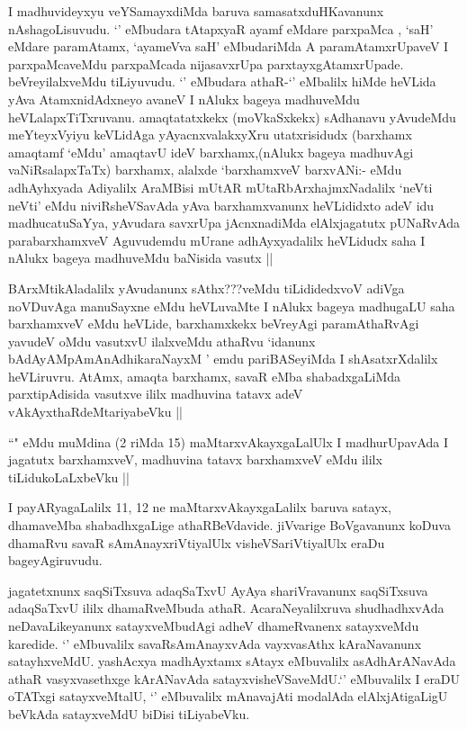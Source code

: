 \begin{artha}
 I madhuvideyxyu veYSamayxdiMda baruva samasatxduHKavanunx nAshagoLisuvudu. `\stext' eMbudara tAtapxyaR ayamf eMdare parxpaMca , `saH' eMdare paramAtamx, `ayameVva saH' eMbudariMda A paramAtamxrUpaveV I parxpaMcaveMdu parxpaMcada nijasavxrUpa parxtayxgAtamxrUpade. beVreyilalxveMdu tiLiyuvudu. `\stext' eMbudara athaR-`\stext' eMbalilx hiMde heVLida yAva AtamxnidAdxneyo avaneV I nAlukx bageya madhuveMdu heVLalapxTiTxruvanu. amaqtatatxkekx (moVkaSxkekx) sAdhanavu yAvudeMdu meYteyxVyiyu keVLidAga yAyacnxvalakxyXru utatxrisidudx (barxhamx amaqtamf `eMdu' amaqtavU ideV barxhamx,(nAlukx bageya madhuvAgi vaNiRsalapxTaTx) barxhamx, alalxde `barxhamxveV barxvANi:- eMdu adhAyhxyada Adiyalilx AraMBisi mUtAR mUtaRbArxhajmxNadalilx `neVti neVti' eMdu niviRsheVSavAda yAva barxhamxvanunx heVLididxto adeV idu madhucatuSaYya, yAvudara savxrUpa jAcnxnadiMda elAlxjagatutx pUNaRvAda parabarxhamxveV Aguvudemdu mUrane adhAyxyadalilx heVLidudx saha I nAlukx bageya madhuveMdu baNisida vasutx ||
\end{artha}

\begin{artha}
BArxMtikAladalilx yAvudanunx sAthx???veMdu tiLididedxvoV adiVga noVDuvAga manuSayxne eMdu 
heVLuvaMte I nAlukx bageya madhugaLU saha barxhamxveV eMdu heVLide, barxhamxkekx 
beVreyAgi paramAthaRvAgi yavudeV oMdu vasutxvU ilalxveMdu athaRvu `idanunx 
bAdAyAMpAmAnAdhikaraNayxM ' emdu pariBASeyiMda I shAsatxrXdalilx heVLiruvru. AtAmx, 
amaqta barxhamx, savaR eMba shabadxgaLiMda parxtipAdisida vasutxve ililx madhuvina 
tatavx adeV vAkAyxthaRdeMtariyabeVku ||

``\stext" eMdu muMdina (2 riMda 15) maMtarxvAkayxgaLalUlx I madhurUpavAda I jagatutx barxhamxveV, madhuvina tatavx barxhamxveV eMdu ililx tiLidukoLaLxbeVku ||
\end{artha}

\begin{artha}
I payARyagaLalilx 11, 12 ne maMtarxvAkayxgaLalilx baruva satayx, dhamaveMba shabadhxgaLige athaRBeVdavide. jiVvarige BoVgavanunx koDuva dhamaRvu savaR sAmAnayxriVtiyalUlx visheVSariVtiyalUlx eraDu bageyAgiruvudu.

jagatetxnunx saqSiTxsuva adaqSaTxvU AyAya shariVravanunx saqSiTxsuva adaqSaTxvU ililx dhamaRveMbuda  athaR. AcaraNeyalilxruva shudhadhxvAda neDavaLikeyanunx satayxveMbudAgi adheV dhameRvanenx satayxveMdu karedide. `\stext' eMbuvalilx savaRsAmAnayxvAda vayxvasAthx kAraNavanunx satayhxveMdU. yashAcxya madhAyxtamx sAtayx eMbuvalilx asAdhArANavAda athaR vasyxvasethxge kArANavAda satayxvisheVSaveMdU.`\stext' eMbuvalilx I eraDU oTATxgi satayxveMtalU, `\stext' eMbuvalilx mAnavajAti modalAda elAlxjAtigaLigU beVkAda satayxveMdU biDisi tiLiyabeVku.
\end{artha}


